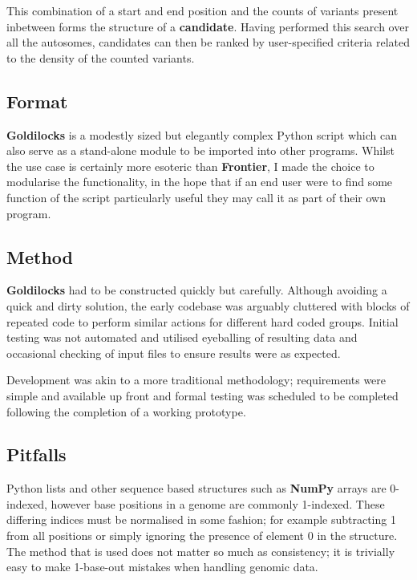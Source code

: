 This combination of a start and end position and the counts of variants present
inbetween forms the structure of a \textbf{candidate}. Having performed this
search over all the autosomes, candidates can then be ranked by user-specified
criteria related to the density of the counted variants.


\subsection{Format}

\textbf{Goldilocks} is a modestly sized but elegantly complex Python script
which can also serve as a stand-alone module to be imported into other
programs. Whilst the use case is certainly more esoteric than \textbf{Frontier},
I made the choice to modularise the functionality, in the hope that if an end
user were to find some function of the script particularly useful they may call
it as part of their own program.


\subsection{Method}

\textbf{Goldilocks} had to be constructed quickly but carefully. Although
avoiding a quick and dirty solution, the early codebase was arguably cluttered
with blocks of repeated code to perform similar actions for different hard coded
groups. Initial testing was not automated and utilised eyeballing of resulting
data and occasional checking of input files to ensure results were as expected.

Development was akin to a more traditional methodology; requirements were simple
and available up front and formal testing was scheduled to be completed
following the completion of a working prototype.


\subsection{Pitfalls}

Python lists and other sequence based structures such as \textbf{NumPy} arrays
are 0-indexed, however base positions in a genome are commonly 1-indexed. These
differing indices must be normalised in some fashion; for example subtracting 1
from all positions or simply ignoring the presence of element 0 in
the structure. The method that is used does not matter so much as consistency;
it is trivially easy to make 1-base-out mistakes when handling genomic data.

